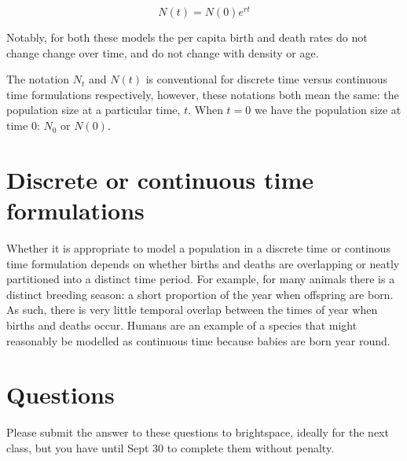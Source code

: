 \documentclass[]{book}
\begin{document}
\begin{equation}
N(t) = N(0)e^{rt}
\label{eq:Exp}
\end{equation}

Notably, for both these models the per capita birth and death rates do
not change change over time, and do not change with density or age.

The notation \(N_t\) and \(N(t)\) is conventional for discrete time
versus continuous time formulations respectively, however, these
notations both mean the same: the population size at a particular time,
\(t\). When \(t=0\) we have the population size at time 0: \(N_0\) or
\(N(0)\).

\section{Discrete or continuous time
formulations}\label{discrete-or-continuous-time-formulations}

Whether it is appropriate to model a population in a discrete time or
continous time formulation depends on whether births and deaths are
overlapping or neatly partitioned into a distinct time period. For
example, for many animals there is a distinct breeding season: a short
proportion of the year when offspring are born. As such, there is very
little temporal overlap between the times of year when births and deaths
occur. Humans are an example of a species that might reasonably be
modelled as continuous time because babies are born year round.

\section{Questions}\label{questions}

Please submit the answer to these questions to brightspace, ideally for
the next class, but you have until Sept 30 to complete them without
penalty.
\end{document}
